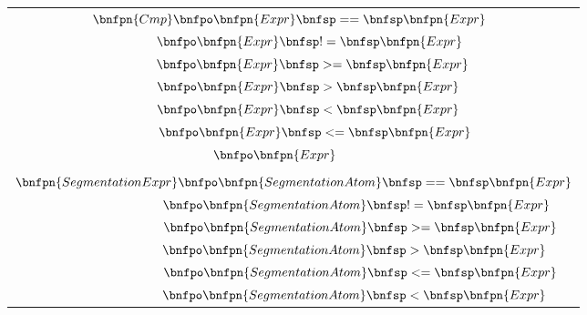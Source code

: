 \begin{longtable}{  c  }
    $\hspace{-0.2cm} \bnfpn{Cmp} \bnfpo \bnfpn{Expr} \bnfsp == \bnfsp \bnfpn{Expr}$                                              \\
    $\hspace{0.9cm} \bnfpo \bnfpn{Expr} \bnfsp != \bnfsp \bnfpn{Expr}$                                                           \\
    $\hspace{1.1cm} \bnfpo \bnfpn{Expr} \bnfsp >= \bnfsp \bnfpn{Expr}$                                                           \\
    $\hspace{0.8cm} \bnfpo \bnfpn{Expr} \bnfsp > \bnfsp \bnfpn{Expr}$                                                            \\
    $\hspace{0.8cm} \bnfpo \bnfpn{Expr} \bnfsp < \bnfsp \bnfpn{Expr}$                                                            \\
    $\hspace{1.2cm} \bnfpo \bnfpn{Expr} \bnfsp <= \bnfsp \bnfpn{Expr}$                                                           \\
    $\hspace{-1cm} \bnfpo \bnfpn{Expr}$                                                                                          \\
    \\
    $\bnfpn{SegmentationExpr} \bnfpo \bnfpn{SegmentationAtom} \bnfsp == \bnfsp \bnfpn{Expr}$                                     \\
    $\hspace{3.5cm} \bnfpo \bnfpn{SegmentationAtom} \bnfsp != \bnfsp \bnfpn{Expr}$                                               \\
    $\hspace{3.7cm} \bnfpo \bnfpn{SegmentationAtom} \bnfsp >= \bnfsp \bnfpn{Expr}$                                               \\
    $\hspace{3.4cm} \bnfpo \bnfpn{SegmentationAtom} \bnfsp > \bnfsp \bnfpn{Expr}$                                                \\
    $\hspace{3.7cm} \bnfpo \bnfpn{SegmentationAtom}  \bnfsp <= \bnfsp  \bnfpn{Expr}$                                             \\
    $\hspace{3.4cm} \bnfpo \bnfpn{SegmentationAtom} \bnfsp < \bnfsp \bnfpn{Expr}$                                                \\

\end{longtable}
